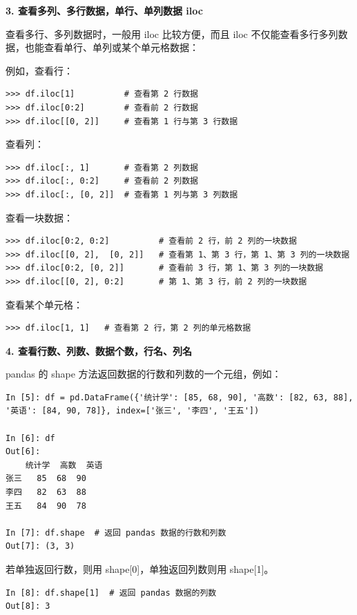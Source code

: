 \noindent\textbf{3. 查看多列、多行数据，单行、单列数据 iloc}

查看多行、多列数据时，一般用 iloc 比较方便，而且 iloc 不仅能查看多行多列数据，也能查看单行、单列或某个单元格数据：

例如，查看行：

\begin{lstlisting}[Language=Python]
>>> df.iloc[1]          # 查看第 2 行数据
>>> df.iloc[0:2]        # 查看前 2 行数据
>>> df.iloc[[0, 2]]     # 查看第 1 行与第 3 行数据
\end{lstlisting}

查看列：

\begin{lstlisting}[Language=Python]
>>> df.iloc[:, 1]       # 查看第 2 列数据
>>> df.iloc[:, 0:2]     # 查看前 2 列数据
>>> df.iloc[:, [0, 2]]  # 查看第 1 列与第 3 列数据
\end{lstlisting}

查看一块数据：
\begin{lstlisting}[Language=Python]
>>> df.iloc[0:2, 0:2]          # 查看前 2 行，前 2 列的一块数据
>>> df.iloc[[0, 2],  [0, 2]]   # 查看第 1、第 3 行，第 1、第 3 列的一块数据
>>> df.iloc[0:2, [0, 2]]       # 查看前 3 行，第 1、第 3 列的一块数据
>>> df.iloc[[0, 2], 0:2]       # 第 1、第 3 行，前 2 列的一块数据
\end{lstlisting}

查看某个单元格：
\begin{lstlisting}[Language=Python]
>>> df.iloc[1, 1]   # 查看第 2 行，第 2 列的单元格数据
\end{lstlisting}

\noindent\textbf{4. 查看行数、列数、数据个数，行名、列名}

pandas 的 shape 方法返回数据的行数和列数的一个元组，例如：


\begin{lstlisting}[Language=Python]
In [5]: df = pd.DataFrame({'统计学': [85, 68, 90], '高数': [82, 63, 88], '英语': [84, 90, 78]}, index=['张三', '李四', '王五'])

In [6]: df
Out[6]:
    统计学  高数  英语
张三   85  68  90
李四   82  63  88
王五   84  90  78

In [7]: df.shape  # 返回 pandas 数据的行数和列数
Out[7]: (3, 3)
\end{lstlisting}


若单独返回行数，则用 shape[0]，单独返回列数则用 shape[1]。

\begin{lstlisting}[Language=Python]
In [8]: df.shape[1]  # 返回 pandas 数据的列数
Out[8]: 3
\end{lstlisting}

